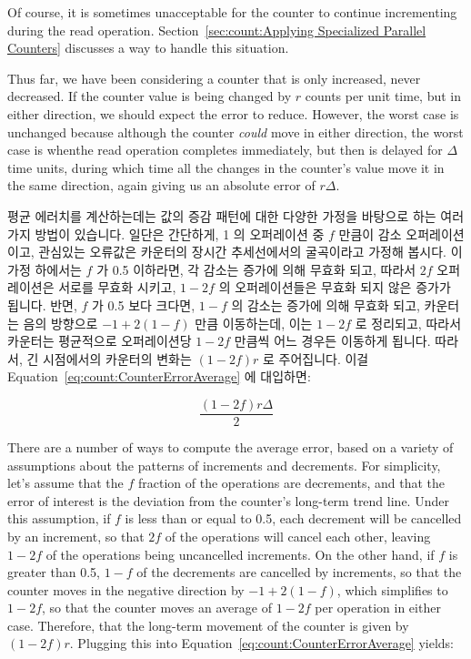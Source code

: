 {	Of course, it is sometimes unacceptable for the counter to
	continue incrementing during the read operation.
	Section~\ref{sec:count:Applying Specialized Parallel Counters}
	discusses a way to handle this situation.

	Thus far, we have been considering a counter that is only
	increased, never decreased.
	If the counter value is being changed by $r$ counts per unit
	time, but in either direction, we should expect the error
	to reduce.
	However, the worst case is unchanged because although the
	counter \emph{could} move in either direction, the worst
	case is whenthe read operation completes immediately,
	but then is delayed for $\Delta$ time units, during which
	time all the changes in the counter's value move it in
	the same direction, again giving us an absolute error
	of $r \Delta$.
	\fi

	평균 에러치를 계산하는데는 값의 증감 패턴에 대한 다양한 가정을 바탕으로
	하는 여러가지 방법이 있습니다.
	일단은 간단하게, 1 의 오퍼레이션 중 $f$ 만큼이 감소 오퍼레이션이고,
	관심있는 오류값은 카운터의 장시간 추세선에서의 굴곡이라고 가정해
	봅시다.
	이 가정 하에서는 $f$ 가 0.5 이하라면, 각 감소는 증가에 의해 무효화
	되고, 따라서 $2f$ 오퍼레이션은 서로를 무효화 시키고, $1-2f$ 의
	오퍼레이션들은 무효화 되지 않은 증가가 됩니다.
	반면, $f$ 가 0.5 보다 크다면, $1-f$ 의 감소는 증가에 의해 무효화 되고,
	카운터는 음의 방향으로 $-1+2\left(1-f\right)$ 만큼 이동하는데, 이는
	$1-2f$ 로 정리되고, 따라서 카운터는 평균적으로 오퍼레이션당 $1-2f$
	만큼씩 어느 경우든 이동하게 됩니다.
	따라서, 긴 시점에서의 카운터의 변화는 $\left( 1-2f \right) r$ 로
	주어집니다.
	이걸 Equation~\ref{eq:count:CounterErrorAverage} 에 대입하면:

	\begin{equation}
		\frac{\left( 1 - 2 f \right) r \Delta}{2}
	\end{equation}
	\iffalse

	There are a number of ways to compute the average error,
	based on a variety of assumptions about the patterns of
	increments and decrements.
	For simplicity, let's assume that the $f$ fraction of
	the operations are decrements, and that the error of interest
	is the deviation from the counter's long-term trend line.
	Under this assumption, if $f$ is less than or equal to 0.5,
	each decrement will be cancelled by an increment, so that
	$2f$ of the operations will cancel each other, leaving
	$1-2f$ of the operations being uncancelled increments.
	On the other hand, if $f$ is greater than 0.5, $1-f$ of
	the decrements are cancelled by increments, so that the
	counter moves in the negative direction by $-1+2\left(1-f\right)$,
	which simplifies to $1-2f$, so that the counter moves an average
	of $1-2f$ per operation in either case.
	Therefore, that the long-term
	movement of the counter is given by $\left( 1-2f \right) r$.
	Plugging this into
	Equation~\ref{eq:count:CounterErrorAverage} yields:

}
